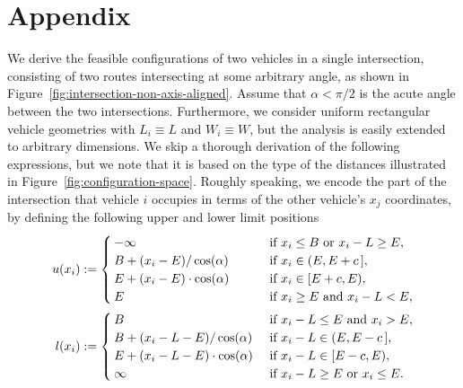 \documentclass{report}
\theoremstyle{definition}
\theoremstyle{plain}
\newcommand\halfopen[2]{\ensuremath{[#1,#2)}}
\newcommand\openhalf[2]{\ensuremath{(#1,#2]}}
\begin{document}
\chapter*{Appendix}

\label{app:configuration-space}

We derive the feasible configurations of two vehicles in a single intersection,
consisting of two routes intersecting at some arbitrary angle, as shown in
Figure~\ref{fig:intersection-non-axis-aligned}.
Assume that $\alpha < \pi / 2$ is the acute angle between the two intersections.
%
Furthermore, we consider uniform rectangular vehicle geometries with
$L_{i} \equiv L$ and $W_{i} \equiv W$, but the analysis is easily extended to
arbitrary dimensions.
%
We skip a thorough derivation of the following expressions, but we note that it
is based on the type of the distances illustrated in
Figure~\ref{fig:configuration-space}.
%
Roughly speaking, we encode the part of the intersection that vehicle $i$
occupies in terms of the other vehicle's $x_{j}$ coordinates, by defining the
following upper and lower limit positions
\begin{align}
  u(x_{i}) &:=
  \begin{cases}
    -\infty & \hspace{1.9em} \text{ if } x_{i} \leq B \text{ or } x_{i} - L \geq E , \\
    B + (x_{i} - E) / \cos(\alpha) & \hspace{1.9em} \text{ if } x_{i} \in \openhalf{E}{E + c\,} , \\
    E + (x_{i} - E) \cdot \cos(\alpha) & \hspace{1.9em} \text{ if } x_{i} \in \halfopen{E + c}{E} , \\
    E & \hspace{1.9em} \text{ if } x_{i} \geq E \text{ and } x_{i} - L < E ,
  \end{cases} \\
  l(x_{i}) &:=
  \begin{cases}
    B & \text{ if } x_{i} - L \leq E \text{ and } x_{i} > E , \\
    B + (x_{i} - L - E) / \cos(\alpha)     & \text{ if } x_{i} - L \in \openhalf{E}{E - c\,} , \\
    E + (x_{i} - L - E) \cdot \cos(\alpha) & \text{ if } x_{i} - L \in \halfopen{E - c}{E} , \\
    \infty & \text{ if } x_{i} - L \geq E \text{ or } x_{i} \leq E .
  \end{cases}
\end{align}
\end{document}
